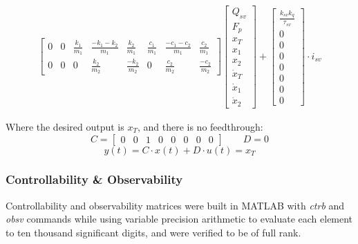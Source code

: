 \documentclass[10pt]{extarticle}
\begin{document}
\begin{align}
\begin{bmatrix}
                    0 &                0             & \frac{k_1}{m_1}  &\frac{-k_1-k_2}{m_1} & \frac{k_2}{m_1} & \frac{c_1}{m_1}         &\frac{-c_1-c_2}{m_1} & \frac{c_2}{m_1} \\[6pt]
                    0 &                0             &         0        & \frac{k_2}{m_2}     & \frac{-k_2}{m_2}& 0                       & \frac{c_2}{m_2}     & \frac{-c_2}{m_2}
    \end{bmatrix}             
    \begin{bmatrix}
        Q_{sv} \\[6pt]
        F_p \\[6pt]
        x_T \\[6pt]
        x_1 \\[6pt]
        x_2 \\[6pt]
        \dot{x}_T \\[6pt]
        \dot{x}_1 \\[6pt]
        \dot{x}_2
    \end{bmatrix} +
    \begin{bmatrix}
        \frac{k_{sv}k_q}{\tau_{sv}}  \\[6pt]
        0 \\[6pt]
        0 \\[6pt]
        0 \\[6pt]
        0 \\[6pt]
        0 \\[6pt]
        0 \\[6pt]
        0
    \end{bmatrix}
    \cdot i_{sv}
\end{align}

\vspace{2mm}

Where the desired output is $x_T$, and there is no feedthrough: 
$$ C = \begin{bmatrix}
0 & 0 & 1 & 0 & 0 & 0 & 0 & 0
\end{bmatrix}
\quad \quad D = 0$$
\begin{equation}
y(t) = C\cdot x(t) + D\cdot u(t) = x_T
\end{equation}

\subsubsection{Controllability \& Observability}
Controllability and observability matrices were built in MATLAB with \emph{ctrb} and \emph{obsv} commands while using variable precision arithmetic to evaluate each element to ten thousand significant digits, and were verified to be of full rank.
\end{document}

